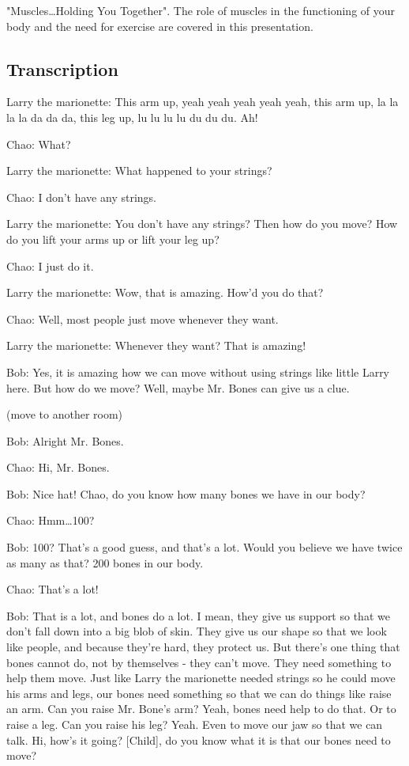 "Muscles\dots Holding You Together". The role of muscles in the functioning of your body and the need for exercise are covered in this presentation.

\subsection{Transcription}

Larry the marionette: This arm up, yeah yeah yeah yeah yeah, this arm up, la la la la da da da, this leg up, lu lu lu lu du du du. Ah!

Chao: What?

Larry the marionette: What happened to your strings?

Chao: I don't have any strings.

Larry the marionette: You don't have any strings? Then how do you move? How do you lift your arms up or lift your leg up?

Chao: I just do it.

Larry the marionette: Wow, that is amazing. How'd you do that?

Chao: Well, most people just move whenever they want.

Larry the marionette: Whenever they want? That is amazing!

Bob: Yes, it is amazing how we can move without using strings like little Larry here. But how do we move? Well, maybe Mr. Bones can give us a clue.

(move to another room)

Bob: Alright Mr. Bones.

Chao: Hi, Mr. Bones.

Bob: Nice hat! Chao, do you know how many bones we have in our body?

Chao: Hmm\dots 100?

Bob: 100? That's a good guess, and that's a lot. Would you believe we have twice as many as that? 200 bones in our body.

Chao: That's a lot!

Bob: That is a lot, and bones do a lot. I mean, they give us support so that we don't fall down into a big blob of skin. They give us our shape so that we look like people, and because they're hard, they protect us. But there's one thing that bones cannot do, not by themselves - they can't move. They need something to help them move. Just like Larry the marionette needed strings so he could move his arms and legs, our bones need something so that we can do things like raise an arm. Can you raise Mr. Bone's arm? Yeah, bones need help to do that. Or to raise a leg. Can you raise his leg? Yeah. Even to move our jaw so that we can talk. Hi, how's it going? [Child], do you know what it is that our bones need to move?


